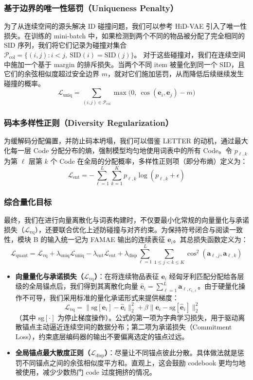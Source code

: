 \documentclass[11pt]{article}
\begin{document}
\subsubsection{基于边界的唯一性惩罚（Uniqueness Penalty）}
为了从连续空间的源头解决 ID 碰撞问题，我们可以参考 HiD-VAE \cite{fang2025hidvae} 引入了唯一性损失。在训练的 mini-batch 中，如果检测到两个不同的物品被分配了完全相同的 SID 序列，我们将它们记录为碰撞对集合 $\mathcal{P}_{\text{col}} = \{(i,j): i<j,\ \text{SID}(i)=\text{SID}(j)\}$。
对于这些碰撞对，我们在连续空间中施加一个基于 margin 的排斥损失。当两个不同 item 被量化到同一个 SID，且它们的余弦相似度超过安全边界 $m$，就对它们施加惩罚，从而降低后续继续发生碰撞的概率。
$$ \mathcal{L}_{\text{uniq}} = \sum_{(i,j)\in\mathcal{P}_{\text{col}}} \max\big(0,\ \cos(\mathbf{e}_i, \mathbf{e}_j) - m\big) $$

\subsubsection{码本多样性正则（Diversity Regularization）}
为缓解码分配偏置，并防止码本坍塌，我们可以借鉴 LETTER \cite{wang2024letter} 的动机，通过最大化每一层 Code 分配分布的熵，强制模型均匀地使用词表中的所有 Code。令 $p_{\ell,k}$ 为第 $\ell$ 层第 $k$ 个 Code 在全局的分配概率，多样性正则项（即分布熵）定义为：
$$ \mathcal{L}_{\text{ent}} = -\sum_{\ell=1}^L \sum_{k=1}^K p_{\ell,k} \log(p_{\ell,k} + \epsilon) $$

\subsubsection{综合量化目标}
最终，我们在进行向量离散化与词表构建时，不仅要最小化常规的向量量化与承诺损失（$\mathcal{L}_{\text{vq}}$），还要联合优化上述防碰撞与对齐约束。为保持符号闭合与阅读一致性，模块 B 的输入统一记为 FAMAE 输出的连续表征 $\mathbf{e}_i$。其总损失函数定义为：
$$ \mathcal{L}_{\text{quant}} = \mathcal{L}_{\text{vq}} + \lambda_{\text{uniq}}\mathcal{L}_{\text{uniq}} - \lambda_{\text{ent}}\mathcal{L}_{\text{ent}} + \lambda_{\text{disp}} \sum_{\ell=1}^L \sum_{1 \le j < k \le K} \cos^2(\mathbf{a}_{\ell,j}, \mathbf{a}_{\ell,k}) $$

\begin{itemize}
    \item \textbf{向量量化与承诺损失（$\mathcal{L}_{\text{vq}}$）}：在将连续物品表征 $\mathbf{e}_i$ 经匈牙利匹配分配给各层级的全局锚点后，我们得到其离散化向量 $\hat{\mathbf{e}}_i = \sum_{\ell=1}^L \mathbf{a}_{\ell, c_{i,\ell}}$。由于硬量化操作不可导，我们采用标准的量化承诺形式来提供梯度：
    $$ \mathcal{L}_{\text{vq}} = \|\text{sg}[\mathbf{e}_i] - \hat{\mathbf{e}}_i\|_2^2 + \beta\|\mathbf{e}_i - \text{sg}[\hat{\mathbf{e}}_i]\|_2^2 $$
    （其中 $\text{sg}[\cdot]$ 为停止梯度操作）。公式的第一项为字典学习损失，用于驱动离散锚点主动逼近连续空间的数据分布；第二项为承诺损失（Commitment Loss），约束底层编码器的输出不要偏离选定的锚点过远。
    
    \item \textbf{全局锚点最大散度正则（$\mathcal{L}_{\text{disp}}$）}：尽量让不同锚点彼此分散。具体做法就是惩罚不同锚点之间的余弦相似度平方和。直观上，这会鼓励 codebook 更均匀地被使用，减少少数热门 code 过度拥挤的情况。
\end{itemize}
\end{document}
